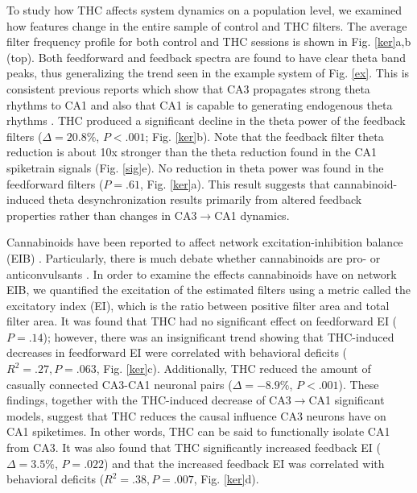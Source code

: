 \documentclass[11pt,a4paper,final]{article}
\begin{document}
To study how THC affects system dynamics on a population level, we examined how features change in the entire sample of control and THC filters.
The average filter frequency profile for both control and THC sessions is shown in Fig. \ref{ker}a,b (top).
Both feedforward and feedback spectra are found to have clear theta band peaks, thus generalizing the trend seen in the example system of Fig. \ref{ex}.
This is consistent previous reports which show that CA3 propagates strong theta rhythms to CA1 \citep{kocsis99,buzsaki02} and also that CA1 is capable to generating endogenous theta rhythms \citep{williams09}.
THC produced a significant decline in the theta power of the feedback filters ($\Delta=20.8\%$, $P<.001$; Fig. \ref{ker}b).
Note that the feedback filter theta reduction is about 10x stronger than the theta reduction found in the CA1 spiketrain signals (Fig. \ref{sig}e).
No reduction in theta power was found in the feedforward filters ($P=.61$, Fig. \ref{ker}a).
This result suggests that cannabinoid-induced theta desynchronization results primarily from altered feedback properties rather than changes in CA3$\to$CA1 dynamics.

Cannabinoids have been reported to affect network excitation-inhibition balance (EIB) \citep{ozaita12,monory15}.
Particularly, there is much debate whether cannabinoids are pro- or anticonvulsants \citep{hill13,turkanis82,clement03,blair06,rudenko12}.
In order to examine the effects cannabinoids have on network EIB, we quantified the excitation of the estimated filters using a metric called the excitatory index (EI), which is the ratio between positive filter area and total filter area.
It was found that THC had no significant effect on feedforward EI ($P=.14$); however, there was an insignificant trend showing that THC-induced decreases in feedforward EI were correlated with behavioral deficits ($R^2=.27, P=.063$, Fig. \ref{ker}c).
Additionally, THC reduced the amount of casually connected CA3-CA1 neuronal pairs ($\Delta=-8.9\%$, $P<.001$).
These findings, together with the THC-induced decrease of CA3$\to$CA1 significant models, suggest that THC reduces the causal influence CA3 neurons have on CA1 spiketimes.
In other words, THC can be said to functionally isolate CA1 from CA3.
It was also found that THC significantly increased feedback EI ($\Delta=3.5\%$, $P=.022$) and that the increased feedback EI was correlated with behavioral deficits ($R^2=.38, P=.007$, Fig. \ref{ker}d).
\end{document}
